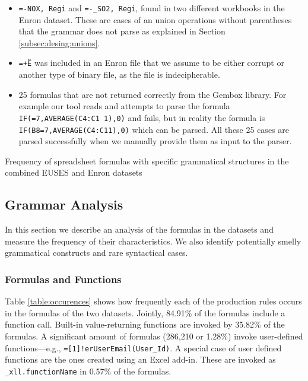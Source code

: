\documentclass[conference]{IEEEtran}
\begin{document}
\begin{itemize}
	\item \texttt{=-NOX, Regi} and \texttt{=-_SO2, Regi}, found in two different workbooks in the Enron dataset. These are cases of an union operations without parentheses that the grammar does not parse as explained in Section \ref{subsec:desing:unions}.
	\item \texttt{=+Ë\textperthousand} was included in an Enron file that we assume to be either corrupt or another type of binary file, as the file is indecipherable.
	\item 25 formulas that are not returned correctly from the Gembox library. For example our tool reads and attempts to parse the formula \texttt{IF(=7,AVERAGE(C4:C1 1),0)} and fails, but in reality the formula is \texttt{IF(B8=7,AVERAGE(C4:C11),0)} which can be parsed. All these 25 cases are parsed successfully when we manually provide them as input to the parser.
\end{itemize}

\begin{table}
	\vspace{2mm}
	\caption{Frequency of spreadsheet formulas with specific grammatical structures in the combined EUSES and Enron datasets}
	\label{table:occurences}
	\centering
	
\end{table}
\subsection{Grammar Analysis}
\label{subsection:grammarAnalysis}
In this section we describe an analysis of the formulas in the datasets and measure the frequency of their characteristics. We also identify potentially smelly grammatical constructs and rare syntactical cases.

\subsubsection{Formulas and Functions}

Table \ref{table:occurences} shows how frequently each of the production rules occurs in the formulas of the two datasets. Jointly, 84.91\% of the formulas include a function call. Built-in value-returning functions are invoked by 35.82\% of the formulas.
A significant amount of formulas (286,210 or 1.28\%) invoke user-defined functions---e.g., \texttt{=[1]!erUserEmail(User_Id)}. A special case of user defined functions are the ones created using an Excel add-in. These are invoked as \texttt{_xll.functionName} in 0.57\% of the formulas.
\end{document}
